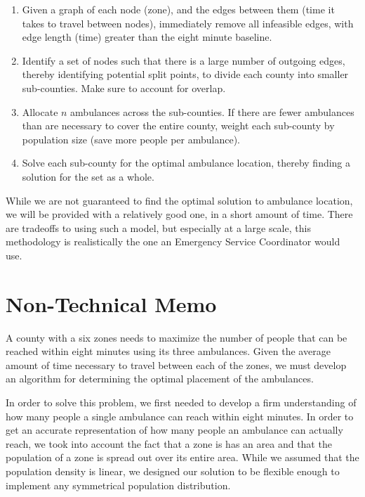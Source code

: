 \documentclass[notitlepage, 12pt]{article}
\begin{document}
\begin{enumerate}
\item Given a graph of each node (zone), and the edges between them (time it takes to travel between nodes),
    immediately remove all infeasible edges, with edge length (time) greater than the eight minute baseline.

\item Identify a set of nodes such that there is a large number of outgoing edges, thereby identifying potential
    split points, to divide each county into smaller sub-counties. Make sure to account for overlap.

\item Allocate $n$ ambulances across the sub-counties. If there are fewer ambulances than are necessary to cover
    the entire county, weight each sub-county by population size (save more people per ambulance).

\item Solve each sub-county for the optimal ambulance location, thereby finding a solution for the set as a whole.
\end{enumerate}

While we are not guaranteed to find the optimal solution to ambulance location, we will be provided with a relatively
good one, in a short amount of time. There are tradeoffs to using such a model, but especially at a large scale,
this methodology is realistically the one an Emergency Service Coordinator would use.

\newpage
\section{Non-Technical Memo}
A county with a six zones needs to maximize the number of people that can be reached within eight minutes using its three ambulances. Given the average amount of time necessary to travel  between each of the zones, we must develop an algorithm for determining the optimal placement of the ambulances.
	
In order to solve this problem, we first needed to develop a firm understanding of how many people a single ambulance can reach within eight minutes. In order to get an accurate representation of how many people an ambulance can actually reach, we took into account the fact that a zone is has an area and that the population of a zone is spread out over its entire area. While we assumed that the population density is linear, we designed our solution to be flexible enough to implement  any  symmetrical population distribution.
\end{document}
